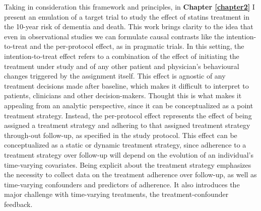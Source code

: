 \documentclass[
]{book}
\begin{document}
Taking in consideration this framework and principles, in \textbf{Chapter \ref{chapter2}} I present an emulation of a target trial to study the effect of statins treatment in the 10-year risk of dementia and death. This work brings clarity to the idea that even in observational studies we can formulate causal contrasts like the intention-to-treat and the per-protocol effect, as in pragmatic trials. In this setting, the intention-to-treat effect refers to a combination of the effect of initiating the treatment under study and of any other patient and physician's behavioural changes triggered by the assignment itself. This effect is agnostic of any treatment decisions made after baseline, which makes it difficult to interpret to patients, clinicians and other decision-makers\autocite{murray2019,murray2018}. Thought this is what makes it appealing from an analytic perspective, since it can be conceptualized as a point treatment strategy. Instead, the per-protocol effect represents the effect of being assigned a treatment strategy and adhering to that assigned treatment strategy through-out follow-up, as specified in the study protocol. This effect can be conceptualized as a static or dynamic treatment strategy, since adherence to a treatment strategy over follow-up will depend on the evolution of an individual's time-varying covariates\autocite{whatif2020}. Being explicit about the treatment strategy emphasizes the necessity to collect data on the treatment adherence over follow-up, as well as time-varying confounders and predictors of adherence. It also introduces the major challenge with time-varying treatments, the treatment-confounder feedback.
\end{document}
